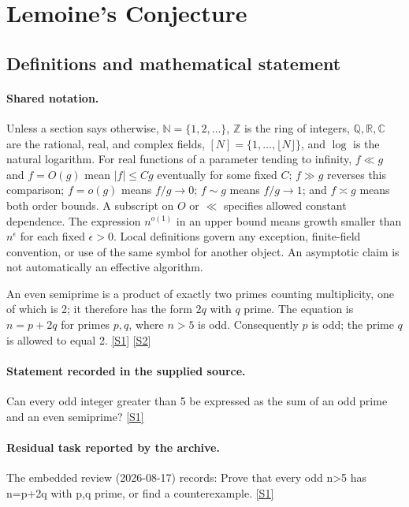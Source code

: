 \documentclass[11pt,a4paper]{article}
\newcommand{\N}{\mathbb{N}}
\newcommand{\Z}{\mathbb{Z}}
\newcommand{\Q}{\mathbb{Q}}
\newcommand{\R}{\mathbb{R}}
\newcommand{\C}{\mathbb{C}}
\newcommand{\sref}[2]{\hyperlink{source:#1:#2}{[S#2]}}
\begin{document}
\section{Lemoine's Conjecture}\label{statement}


\subsection{Definitions and mathematical statement}

\paragraph{Shared notation.}Unless a section says otherwise, $\N=\{1,2,\ldots\}$,
$\Z$ is the ring of integers, $\Q,\R,\C$ are the rational, real, and complex
fields, $[N]=\{1,\ldots,\lfloor N\rfloor\}$, and $\log$ is the natural
logarithm. For real functions of a parameter tending to infinity,
$f\ll g$ and $f=O(g)$ mean $|f|\leq Cg$ eventually for some fixed $C$;
$f\gg g$ reverses this comparison; $f=o(g)$ means $f/g\to0$;
$f\sim g$ means $f/g\to1$; and $f\asymp g$ means both order bounds.
A subscript on $O$ or $\ll$ specifies allowed constant dependence.
The expression $n^{o(1)}$ in an upper bound means growth smaller than
$n^\epsilon$ for each fixed $\epsilon>0$. Local definitions govern any
exception, finite-field convention, or use of the same symbol for another
object. An asymptotic claim is not automatically an effective algorithm.



An even semiprime is a product of exactly two primes counting multiplicity, one of which is 2; it therefore has the form $2q$ with $q$ prime. The equation is $n=p+2q$ for primes $p,q$, where $n>5$ is odd. Consequently $p$ is odd; the prime $q$ is allowed to equal 2. \sref{statement}{1} \sref{statement}{2}

\paragraph{Statement recorded in the supplied source.}
Can every odd integer greater than 5 be expressed as the sum of an odd prime and an even semiprime? \sref{statement}{1}

\paragraph{Residual task reported by the archive.}

The embedded review (2026-08-17) records: Prove that every odd n>5 has n=p+2q with p,q prime, or find a counterexample. \sref{statement}{1}
\end{document}
